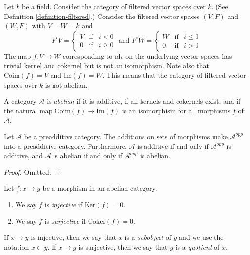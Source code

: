 \begin{example}
\label{example-not-abelian}
Let $k$ be a field.
Consider the category
of filtered vector spaces over $k$.
(See Definition \ref{definition-filtered}.)
Consider the filtered vector spaces $(V, F)$ and $(W, F)$ with
$V = W = k$ and
$$
F^iV
=
\left\{
\begin{matrix}
V & \text{if} & i < 0 \\
0 & \text{if} & i \geq 0
\end{matrix}
\right.
\text{ and }
F^iW
=
\left\{
\begin{matrix}
W & \text{if} & i \leq 0 \\
0 & \text{if} & i > 0
\end{matrix}
\right.
$$
The map $f : V \to W$ corresponding to $\text{id}_k$ on the underlying
vector spaces has trivial kernel and cokernel but is not
an isomorphism. Note also that $\text{Coim}(f) = V$ and $\text{Im}(f) = W$.
This means that the category of filtered vector spaces over $k$
is not abelian.
\end{example}

\begin{definition}
\label{definition-abelian-category}
A category $\mathcal{A}$ is {\it abelian} if
it is additive, if all kernels and cokernels exist,
and if the natural map $\text{Coim}(f) \to \text{Im}(f)$
is an isomorphism for all morphisms $f$ of
$\mathcal{A}$.
\end{definition}

\begin{lemma}
\label{lemma-abelian-opposite}
Let $\mathcal{A}$ be a preadditive category.
The additions on sets of morphisms make
$\mathcal{A}^{opp}$ into a preadditive category.
Furthermore, $\mathcal{A}$ is additive if and only if $\mathcal{A}^{opp}$
is additive, and
$\mathcal{A}$ is abelian if and only if $\mathcal{A}^{opp}$ is abelian.
\end{lemma}

\begin{proof}
Omitted.
\end{proof}

\begin{definition}
\label{definition-injective-surjective}
Let $f : x \to y$ be a morphism in an abelian category.
\begin{enumerate}
\item We say $f$ is {\it injective} if $\text{Ker}(f) = 0$.
\item We say $f$ is {\it surjective} if $\text{Coker}(f) = 0$.
\end{enumerate}
If $x \to y$ is injective, then we say that $x$ is a {\it subobject}
of $y$ and we use the notation $x \subset y$. If $x \to y$ is
surjective, then we say that $y$ is a {\it quotient} of $x$.
\end{definition}

